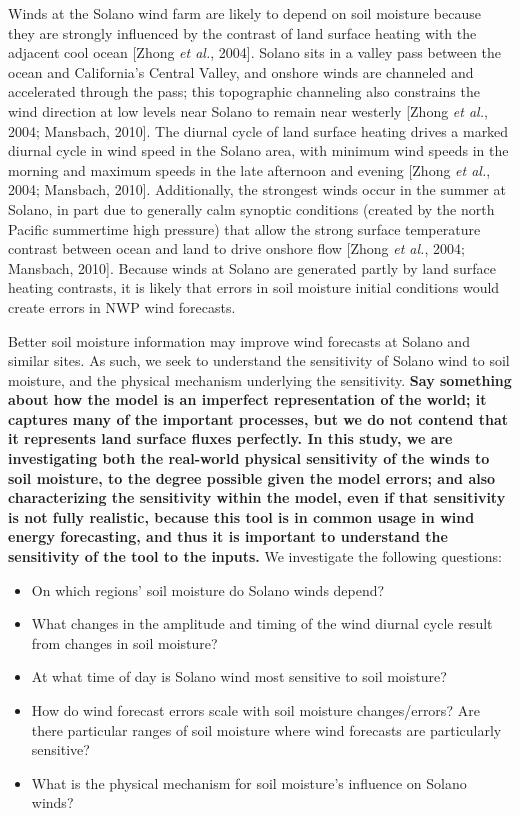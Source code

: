 Winds at the Solano wind farm are likely to depend on soil moisture because they are strongly influenced by the contrast of land surface heating with the adjacent cool ocean [Zhong \textit{et al.}, 2004].  Solano sits in a valley pass between the ocean and California's Central Valley, and onshore winds are channeled and accelerated through the pass; this topographic channeling also constrains the wind direction at low levels near Solano to remain near westerly [Zhong \textit{et al.}, 2004; Mansbach, 2010].  The diurnal cycle of land surface heating drives a marked diurnal cycle in wind speed in the Solano area, with minimum wind speeds in the morning and maximum speeds in the late afternoon and evening [Zhong \textit{et al.}, 2004; Mansbach, 2010].  Additionally, the strongest winds occur in the summer at Solano, in part due to generally calm synoptic conditions (created by the north Pacific summertime high pressure) that allow the strong surface temperature contrast between ocean and land to drive onshore flow [Zhong \textit{et al.}, 2004; Mansbach, 2010]. Because winds at Solano are generated partly by land surface heating contrasts, it is likely that errors in soil moisture initial conditions would create errors in NWP wind forecasts.

Better soil moisture information may improve wind forecasts at Solano and similar sites.  As such, we seek to understand the sensitivity of Solano wind to soil moisture, and the physical mechanism underlying the sensitivity.  \textbf{Say something about how the model is an imperfect representation of the world; it captures many of the important processes, but we do not contend that it represents land surface fluxes perfectly.  In this study, we are investigating both the real-world physical sensitivity of the winds to soil moisture, to the degree possible given the model errors; and also characterizing the sensitivity within the model, even if that sensitivity is not fully realistic, because this tool is in common usage in wind energy forecasting, and thus it is important to understand the sensitivity of the tool to the inputs.}  We investigate the following questions:
\begin{itemize}
\item On which regions' soil moisture do Solano winds depend?
\item What changes in the amplitude and timing of the wind diurnal cycle result from changes in soil moisture?
\item At what time of day is Solano wind most sensitive to soil moisture?
\item How do wind forecast errors scale with soil moisture changes/errors?  Are there particular ranges of soil moisture where wind forecasts are particularly sensitive?
\item What is the physical mechanism for soil moisture's influence on Solano winds?
\end{itemize}

